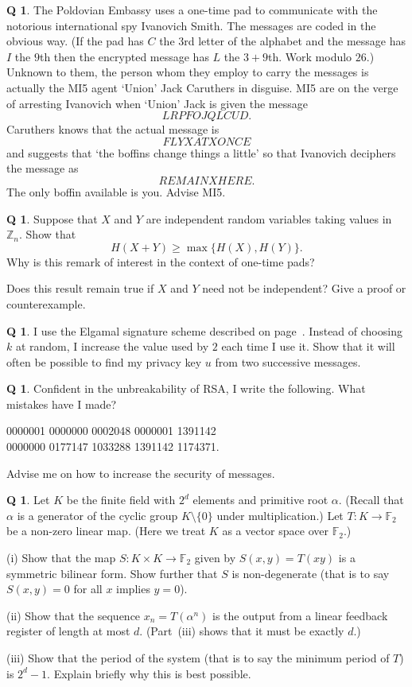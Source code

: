 \documentclass[12pt,a4paper]{article}
\theoremstyle{plain}
\theoremstyle{definition}
\newtheorem{question}[theorem]{Q}
\begin{document}
\begin{question}\label{C4.15} 
The Poldovian Embassy uses a one-time pad
to communicate with the notorious international spy Ivanovich Smith.
The messages are coded in the obvious way. (If the pad has $C$ the
$3$rd letter of the alphabet and the message has $I$ the $9$th
then the encrypted message has $L$ the $3+9$th. Work modulo $26$.)
Unknown to them, the person whom they employ
to carry the messages is actually the MI5 agent
`Union' Jack Caruthers in disguise.
MI5 are on the verge of arresting Ivanovich
when  `Union' Jack is given the message
\[LRPFOJQLCUD.\]
Caruthers knows that the actual message is 
\[FLYXATXONCE\]
and suggests that `the boffins change things a little'
so that Ivanovich deciphers the message as
\[REMAINXHERE.\] 
The only boffin available is you. Advise MI5.
\end{question} 
\begin{question}\label{E;add}\label{C4.16}
Suppose that $X$ and $Y$ are independent random variables
taking values in ${\mathbb Z}_{n}$. Show that 
\[H(X+Y)\geq \max\{H(X),H(Y)\}.\]
Why is this remark of interest in the context of one-time pads?

Does this result remain true if $X$ and $Y$ need not be independent?
Give a proof or counterexample.
\end{question}


\begin{question}\label{C4.17}
I use the Elgamal signature scheme
described on page~\pageref{P;Elgamal}. Instead of choosing $k$
at random, I increase the value used by $2$ each time I use it.
Show that it will often be possible to find
my privacy key $u$ from two
successive messages.
\end{question}  
\begin{question}\label{C4.18} 
Confident in the unbreakability of
RSA, I write the following. What mistakes have I made?
\begin{center}
0000001 0000000 0002048 0000001 1391142\\
0000000 0177147 1033288 1391142 1174371.
\end{center}
Advise me on how to increase the security of messages.
\end{question}
\begin{question}\label{E;maximum period}\label{C4.19}
Let $K$ be the finite field with $2^{d}$ elements
and primitive root $\alpha$. (Recall that $\alpha$ is
a generator of the cyclic group $K\setminus\{0\}$
under multiplication.) Let $T:K\rightarrow{\mathbb F}_{2}$
be a non-zero linear map. (Here we treat $K$ as a vector
space over ${\mathbb F}_{2}$.)

(i) Show that the map $S:K\times K \rightarrow{\mathbb F}_{2}$
given by $S(x,y)=T(xy)$ is a symmetric bilinear form.
Show further that $S$ is non-degenerate
(that is to say $S(x,y)=0$ for all $x$ implies $y=0$).

(ii) Show that the sequence $x_{n}=T(\alpha^{n})$
is the output from a linear feedback register of length 
at most $d$. (Part~(iii) shows that it must be exactly $d$.)

(iii) Show that the period of the system (that is to say the minimum
period of $T$) is $2^{d}-1$. Explain briefly why this
is best possible.
\end{question}
\end{document}
